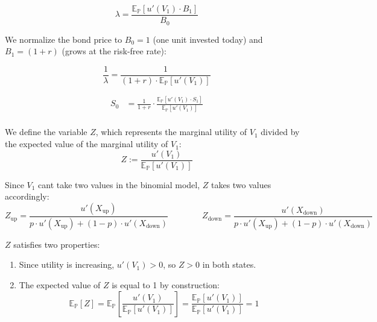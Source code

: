 \documentclass[12pt, a4paper]{article}
\begin{document}
\[
\lambda = \frac{\mathbb{E}_{\mathbb{P}}\left[u'(V_1) \cdot B_1\right]}{B_0}
\tag{II}
\]

\noindent We normalize the bond price to $B_0 = 1$ (one unit invested today) 
and $B_1 = (1+r)$ (grows at the risk-free rate):

\[
\frac{1}{\lambda}
  = \frac{1}{(1+r) \cdot \mathbb{E}_{\mathbb{P}}\left[u'(V_1)\right]}
\]
\vspace{0.1em}

\begin{align*}
S_0
  &= \frac{1}{1+r} \cdot \frac{\mathbb{E}_{\mathbb{P}}\left[u'(V_1) \cdot S_1\right]}{\mathbb{E}_{\mathbb{P}}\left[u'(V_1)\right]}
  \tag{III} \\[4pt]
\end{align*}

\noindent We define the variable $Z$, which represents the marginal utility of $V_1$ divided by the
expected value of the marginal utility of $V_1$:
\[
Z := \frac{u'(V_1)}{\mathbb{E}_{\mathbb{P}}\!\left[u'(V_1)\right]}
\]
\vspace{0.5em}

\noindent Since $V_1$ cant take two values in the binomial model, 
$Z$ takes two values accordingly:
\[
Z_{\text{up}} =
  \frac{u'(X_{\text{up}})}
       {p \cdot u'(X_{\text{up}}) + (1-p) \cdot u'(X_{\text{down}})}
\qquad\qquad
Z_{\text{down}} =
  \frac{u'(X_{\text{down}})}
       {p \cdot u'(X_{\text{up}}) + (1-p) \cdot u'(X_{\text{down}})}
\]

\vspace{1.5em}

\noindent $Z$ satisfies two properties:

\begin{enumerate}
  \item Since utility is increasing, $u'(V_1) > 0$, so $Z > 0$ 
        in both states.

  \vspace{0.2em}

  \item The expected value of $Z$ is equal to 1 by construction:
        \[
          \mathbb{E}_{\mathbb{P}}[Z]
          = \mathbb{E}_{\mathbb{P}}\!\left[\frac{u'(V_1)}{\mathbb{E}_{\mathbb{P}}\!\left[u'(V_1)\right]}\right]
          = \frac{\mathbb{E}_{\mathbb{P}}\!\left[u'(V_1)\right]}{\mathbb{E}_{\mathbb{P}}\!\left[u'(V_1)\right]}
          = 1
        \]
\end{enumerate}
\end{document}
